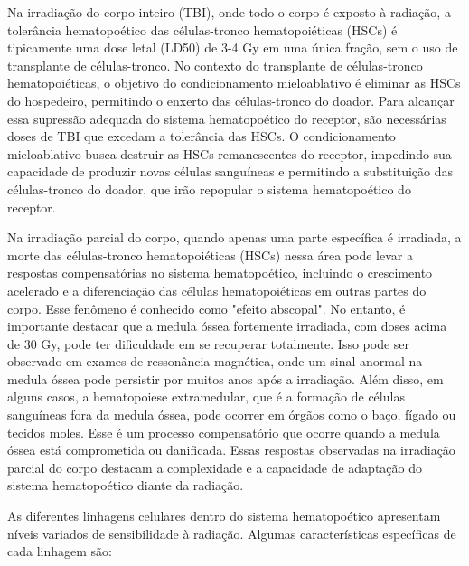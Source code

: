 \documentclass[11pt,a4paper]{article}
\begin{document}
	Na irradiação do corpo inteiro (TBI), onde todo o corpo é exposto à radiação, a tolerância hematopoético das células-tronco hematopoiéticas (HSCs) é tipicamente uma dose letal (LD50) de 3-4 Gy em uma única fração, sem o uso de transplante de células-tronco. No contexto do transplante de células-tronco hematopoiéticas, o objetivo do condicionamento mieloablativo é eliminar as HSCs do hospedeiro, permitindo o enxerto das células-tronco do doador. Para alcançar essa supressão adequada do sistema hematopoético do receptor, são necessárias doses de TBI que excedam a tolerância das HSCs. O condicionamento mieloablativo busca destruir as HSCs remanescentes do receptor, impedindo sua capacidade de produzir novas células sanguíneas e permitindo a substituição das células-tronco do doador, que irão repopular o sistema hematopoético do receptor.

	Na irradiação parcial do corpo, quando apenas uma parte específica é irradiada, a morte das células-tronco hematopoiéticas (HSCs) nessa área pode levar a respostas compensatórias no sistema hematopoético, incluindo o crescimento acelerado e a diferenciação das células hematopoiéticas em outras partes do corpo. Esse fenômeno é conhecido como "efeito abscopal".
	No entanto, é importante destacar que a medula óssea fortemente irradiada, com doses acima de 30 Gy, pode ter dificuldade em se recuperar totalmente. Isso pode ser observado em exames de ressonância magnética, onde um sinal anormal na medula óssea pode persistir por muitos anos após a irradiação. Além disso, em alguns casos, a hematopoiese extramedular, que é a formação de células sanguíneas fora da medula óssea, pode ocorrer em órgãos como o baço, fígado ou tecidos moles. Esse é um processo compensatório que ocorre quando a medula óssea está comprometida ou danificada. Essas respostas observadas na irradiação parcial do corpo destacam a complexidade e a capacidade de adaptação do sistema hematopoético diante da radiação. 

	As diferentes linhagens celulares dentro do sistema hematopoético apresentam níveis variados de sensibilidade à radiação. Algumas características específicas de cada linhagem são:
\end{document}
